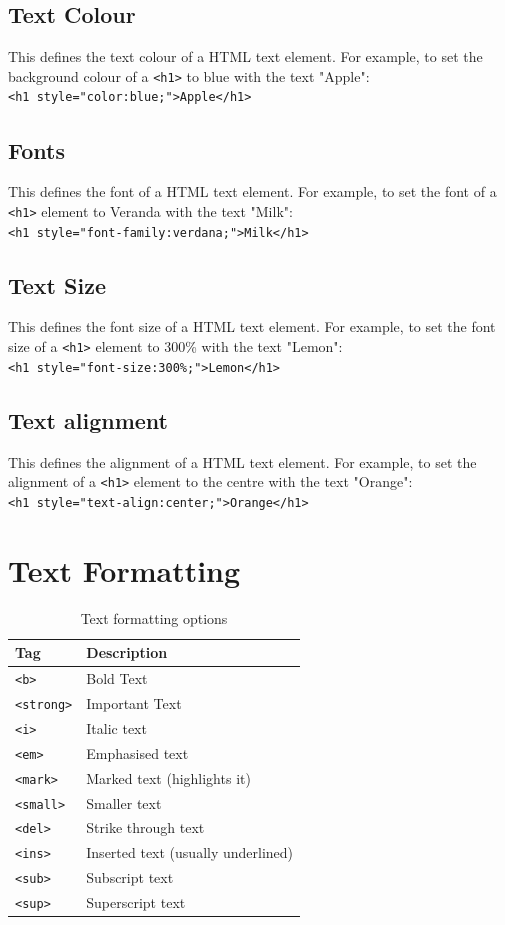 \documentclass{thomasClass}
\begin{document}
\subsection{Text Colour}
This defines the text colour of a HTML text element. For example, to set the background colour of a \verb|<h1>| to blue with the text "Apple":\\
\verb|<h1 style="color:blue;">Apple</h1> |
\subsection{Fonts}
This defines the font of a HTML text element. For example, to set the font of a \verb|<h1>| element to Veranda with the text "Milk":\\
\verb|<h1 style="font-family:verdana;">Milk</h1>|
\subsection{Text Size}
This defines the font size of a HTML text element. For example, to set the font size of a \verb|<h1>| element to 300\% with the text "Lemon":\\
\verb|<h1 style="font-size:300%;">Lemon</h1>|
\subsection{Text alignment}
This defines the alignment of a HTML text element. For example, to set the alignment of a \verb|<h1>| element to the centre with the text "Orange":\\
\verb|<h1 style="text-align:center;">Orange</h1>|

\section{Text Formatting}
\begin{table}[H]
    \centering
    \begin{tabularx}{0.5\textwidth}{X|X}
        Tag & Description\\
        \hline
        \verb|<b>| & Bold Text \\
        \verb|<strong>| & Important Text\\
        \verb|<i>| & Italic text\\
        \verb|<em>| & Emphasised text\\
        \verb|<mark>| & Marked text (highlights it)\\
        \verb|<small>| & Smaller text\\
        \verb|<del>| & Strike through text\\
        \verb|<ins>| & Inserted text (usually underlined)\\
        \verb|<sub>| & Subscript text\\
        \verb|<sup>| & Superscript text
    \end{tabularx}
    \caption{Text formatting options}
    \label{tab:textFormatting}
\end{table}
\end{document}
